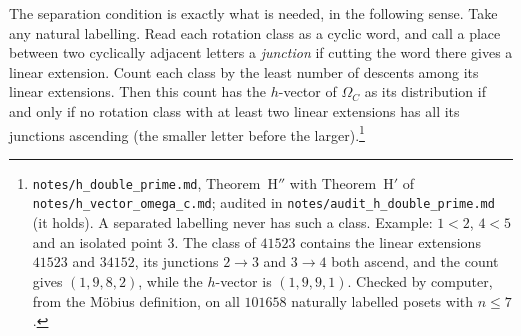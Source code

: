\documentclass[11pt]{article}
\theoremstyle{definition}
\theoremstyle{remark}
\newcommand{\src}[1]{\nolinkurl{#1}}
\newcommand{\tagbox}[1]{\leavevmode\marginpar{\raggedright\fbox{\parbox{0.66in}{\centering\scriptsize\sffamily #1}}}}
\newcommand{\PROVEN}{\tagbox{PROVEN\\AUDITED}}
\begin{document}
The separation condition is exactly what is needed, in the following
sense. Take any natural labelling. Read each rotation class as a cyclic
word, and call a place between two cyclically adjacent letters a
\emph{junction} if cutting the word there gives a linear extension.
Count each class by the least number of descents among its linear
extensions. Then this count has the $h$-vector of $\Omega_C$ as its
distribution if and only if no rotation class with at least two linear
extensions has all its junctions ascending (the smaller letter before
the larger).\PROVEN\footnote{\src{notes/h_double_prime.md}, Theorem~H$''$
with Theorem~H$'$ of \src{notes/h_vector_omega_c.md}; audited in
\src{notes/audit_h_double_prime.md} (it holds). A separated labelling
never has such a class. Example: $1<2$, $4<5$ and an isolated point $3$.
The class of $41523$ contains the linear extensions $41523$ and $34152$,
its junctions $2\to3$ and $3\to4$ both ascend, and the count gives
$(1,9,8,2)$, while the $h$-vector is $(1,9,9,1)$. Checked by computer,
from the M\"obius definition, on all $101658$ naturally labelled posets
with $n\le7$.}
\end{document}
